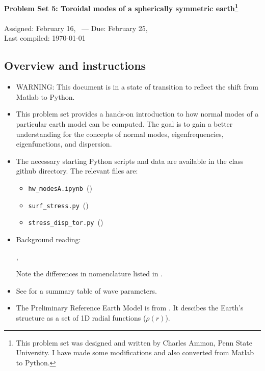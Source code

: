 \documentclass[11pt,titlepage,fleqn]{article}
\newcommand{\tfileA}{{\tt hw\_modesA.ipynb}}
\newcommand{\tfileB}{{\tt surf\_stress.py}}
\newcommand{\tfileC}{{\tt stress\_disp\_tor.py}}
\begin{document}

\begin{spacing}{1.2}
\centering
{\large \bf Problem Set 5: Toroidal modes of a spherically symmetric earth\footnote{This problem set was designed and written by Charles Ammon, Penn State University. I have made some modifications and also converted from Matlab to Python.}} \\
\cltag\ \\
Assigned: February 16, \cyear\ --- Due: February 25, \cyear\ \\
Last compiled: \today \\
\end{spacing}


\subsection*{Overview and instructions}

\begin{itemize}
\item WARNING: This document is in a state of transition to reflect the shift from Matlab to Python.

\item This problem set provides a hands-on introduction to how normal modes of a particular earth model can be computed. The goal is to gain a better understanding for the concepts of normal modes, eigenfrequencies, eigenfunctions, and dispersion.

\item The necessary starting Python scripts and data are available in the class github directory. The relevant files are:
%
\begin{itemize}
\item \tfileA\ ()
\item \tfileB\ ()
\item \tfileC\ ()
\end{itemize}

\item Background reading:

\citet[][Section 2.9]{SteinWysession}, \citet[][Ch.~8]{DT}

Note the differences in nomenclature listed in .

\item See  for a summary table of wave parameters.

\item The Preliminary Reference Earth Model is from \citet{PREM}. It descibes the Earth's structure as a set of 1D radial functions (\eg $\rho(r)$).

\end{itemize}
\end{document}
